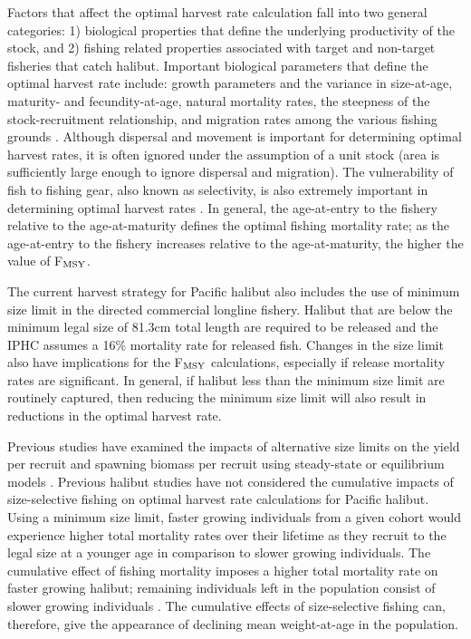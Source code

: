 Factors that affect the optimal harvest rate calculation fall into two general categories: 1) biological properties that define the underlying productivity of the stock, and 2) fishing related properties associated with target and non-target fisheries that catch halibut.  Important biological parameters that define the optimal harvest rate include: growth parameters and the variance in size-at-age, maturity- and fecundity-at-age, natural mortality rates, the steepness of the stock-recruitment relationship,  and migration rates among the various fishing grounds \citep{Beddington2005}. Although  dispersal and movement is important for determining optimal harvest rates, it is often ignored under the assumption of a unit stock (area is sufficiently large enough to ignore dispersal and migration). The vulnerability of fish to fishing gear, also known as selectivity, is also extremely important in determining optimal harvest rates \citep{hilborn1992quantitative}.  In general, the age-at-entry to the fishery relative to the age-at-maturity defines the optimal fishing mortality rate; as the age-at-entry to the fishery increases relative to the age-at-maturity, the higher the value of F$_{\rm{MSY}}$.


The current harvest strategy for Pacific halibut also includes the use of minimum size limit in the directed commercial longline fishery. Halibut that are below the minimum legal size of 81.3cm total length are required to be released and the IPHC assumes a 16\% mortality rate for released fish.  Changes in the size limit also have implications for the F$_{\rm{MSY}}$ calculations, especially if release mortality rates are significant. In general, if halibut less than the minimum size limit are routinely captured, then reducing the minimum size limit will also result in reductions in the optimal harvest rate.

Previous studies have examined the impacts of alternative size limits on the yield per recruit and spawning biomass per recruit using steady-state or equilibrium models \citep{clark1995re}.  Previous halibut studies have not considered the cumulative impacts of size-selective fishing on optimal harvest rate calculations for Pacific halibut.  Using a minimum size limit, faster growing individuals from a given cohort would experience higher total mortality rates over their lifetime as they recruit to the legal size at a younger age in comparison to slower growing individuals. The cumulative effect of fishing mortality imposes a higher total mortality rate on faster growing halibut; remaining individuals left in the population consist of slower growing individuals \citep{Taylor2005}.  The cumulative effects of size-selective fishing can, therefore, give the appearance of declining mean weight-at-age in the population.

